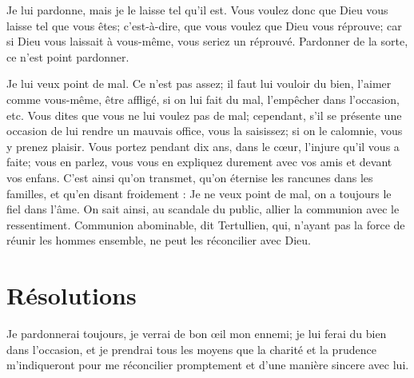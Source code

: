 \documentclass[instructions.tex]{subfiles}
\begin{document}
Je lui pardonne, mais je le laisse tel qu’il est. Vous voulez donc que Dieu vous laisse tel que vous êtes; c’est-à-dire, que vous voulez que Dieu vous réprouve; car si Dieu vous laissait à vous-même, vous seriez un réprouvé. Pardonner de la sorte, ce n’est point pardonner.

Je lui veux point de mal. Ce n’est pas assez; il faut lui vouloir du bien, l’aimer comme vous-même, être affligé, si on lui fait du mal, l’empêcher dans l’occasion, etc. Vous dites que vous ne lui voulez pas de mal; cependant, s’il se présente une occasion de lui rendre un mauvais office, vous la saisissez; si on le calomnie, vous y prenez plaisir. Vous portez pendant dix ans, dans le cœur, l’injure qu’il vous a faite; vous en parlez, vous vous en expliquez durement avec vos amis et devant vos enfans. C’est ainsi qu’on transmet, qu’on éternise les rancunes dans les familles, et qu’en disant froidement : Je ne veux point de mal, on a toujours le fiel dans l’âme. On sait ainsi, au scandale du public, allier la communion avec le ressentiment. Communion abominable, dit Tertullien, qui, n’ayant pas la force de réunir les hommes ensemble, ne peut les réconcilier avec Dieu.
 
\section{Résolutions}
 
\primo Je pardonnerai toujours, je verrai de bon œil mon ennemi; je lui ferai du bien dans l’occasion, et je prendrai tous les moyens que la charité et la prudence m’indiqueront pour me réconcilier promptement et d’une manière sincere avec lui. 

 
\end{document}
